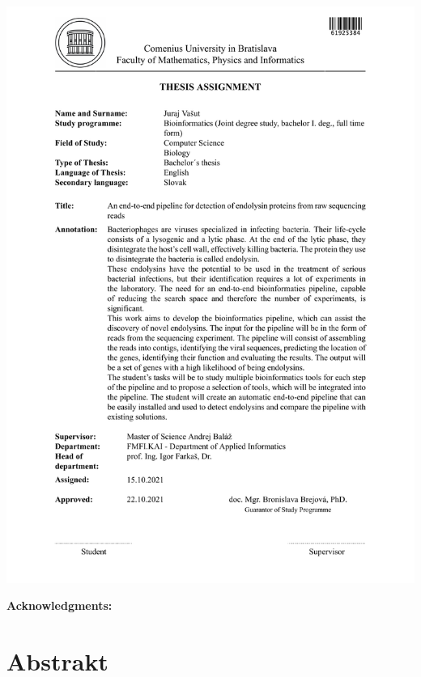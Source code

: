 \documentclass[12pt, twoside]{book}
\begin{document}
\hspace{-2cm}\includegraphics[width=1.1\textwidth]{images/zadanie-en}


\frontmatter

\setcounter{page}{3}
\newpage 

\vfill
{\bf Acknowledgments:} 


\newpage 
\section*{Abstrakt}
\end{document}
